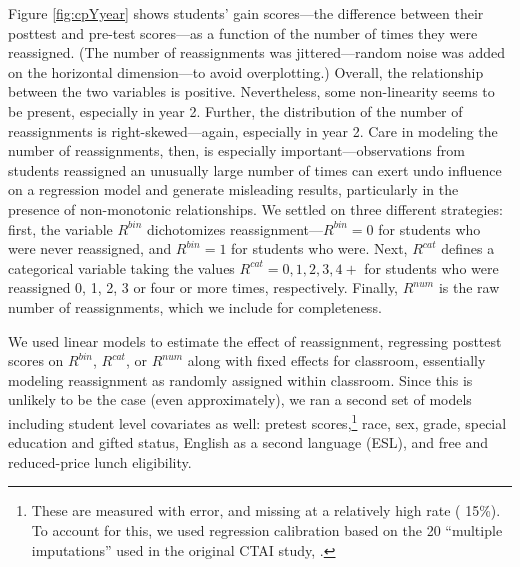 \documentclass[notitlepage,12pt]{jedm}\usepackage[]{graphicx}\usepackage[]{color}
\begin{document}
Figure \ref{fig:cpYyear} shows students' gain scores---the difference between their posttest and pre-test scores---as a function of the number of times they were reassigned.
(The number of reassignments was jittered---random noise was added on
the horizontal dimension---to avoid overplotting.)
Overall, the relationship between the two variables is positive.
Nevertheless, some non-linearity seems to be present, especially in year 2.
Further, the distribution of the number of reassignments is right-skewed---again, especially in year 2.
Care in modeling the number of reassignments, then, is especially important---observations from students reassigned an unusually large number of times can exert undo influence on a regression model and generate misleading results, particularly in the presence of non-monotonic relationships.
We settled on three different strategies: first, the variable $R^{bin}$ dichotomizes reassignment---$R^{bin}=0$ for students who were never reassigned, and $R^{bin}=1$ for students who were.
Next, $R^{cat}$ defines a categorical variable taking the values $R^{cat}=0,1,2,3,4+$ for students who were reassigned 0, 1, 2, 3 or four or more times, respectively.
Finally, $R^{num}$ is the raw number of reassignments, which we include for completeness.

We used linear models to estimate the effect of reassignment, regressing posttest scores on $R^{bin}$, $R^{cat}$, or $R^{num}$ along with fixed effects for classroom, essentially modeling reassignment as randomly assigned within classroom.
Since this is unlikely to be the case (even approximately), we ran a
second set of models including student level covariates as well:
pretest scores,\footnote{These are measured with error, and missing at a relatively high rate (
15\%). To account for
this, we used regression calibration based on the 20 ``multiple
imputations'' used in the original CTAI study,
.} race, sex, grade, special education
and gifted status, English as a second language (ESL), and free and reduced-price lunch eligibility.
\end{document}
